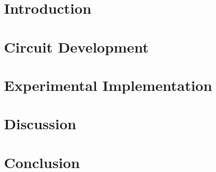 \documentclass{article}
\begin{document}
\tableofcontents

\newpage

\newpage
\listoffigures
\listoftables
\newpage 
\clearpage




\section{Introduction}

  
 
  \section{Circuit Development}
    
  
    

     
 
    
  \section{Experimental Implementation}
  	

    
  \section{Discussion}
     
    
    
    \section{Conclusion}
        

    
    \newpage
\clearpage

\appendix
\end{document}
